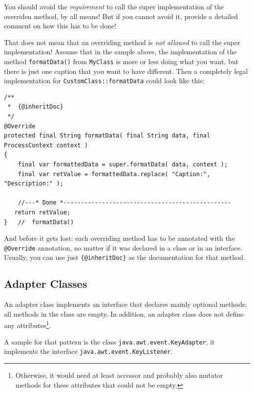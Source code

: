 You should avoid the \textit{requirement} to call the super implementation of the overriden method, by all means! But if you cannot avoid it, provide a detailed comment on how this has to be done!

That does not mean that an overriding method is \textit{not allowed} to call the super implementation! Assume that in the sample above, the implementation of the method \lstinline|formatData()| from \lstinline|MyClass| is more or less doing what you want, but there is just one caption that you want to have different. Then a completely legal implementation for \lstinline|CustomClass::formatData| could look like this:
\begin{lstlisting}
/**
 *  {@inheritDoc}
 */
@Override
protected final String formatData( final String data, final ProcessContext context )
{
	final var formattedData = super.formatData( data, context );
    final var retValue = formattedData.replace( "Caption:", "Description:" );
       
    //---* Done *------------------------------------------------
   return retValue;
}   //  formatData()
\end{lstlisting}

And before it gets lost: each overriding method has to be annotated with the \lstinline|@Override| annotation\autocite{ORACLE_DOC_OVERRIDE_ANNOTATION}, no matter if it was declared in a class or in an interface. Usually, you can use just \verb#{@inheritDoc}# as the documentation for that method.


\subsection{Adapter Classes}\label{sec:Adapter}
An adapter class implements an interface that declares mainly optional methods; all methods in the class are empty. In addition, an adapter class does not define any attributes\footnote{Otherwise, it would need at least accessor and probably also mutator methods for these attributes that could not be empty.}.

A sample for that pattern is the class \lstinline|java.awt.event.KeyAdapter|\autocite{ORACLE_DOC_KEYADAPTER_CLASS}; it implements the interface \lstinline|java.awt.event.KeyListener|\autocite{ORACLE_DOC_KEYADAPTER_INTERFACE}.

